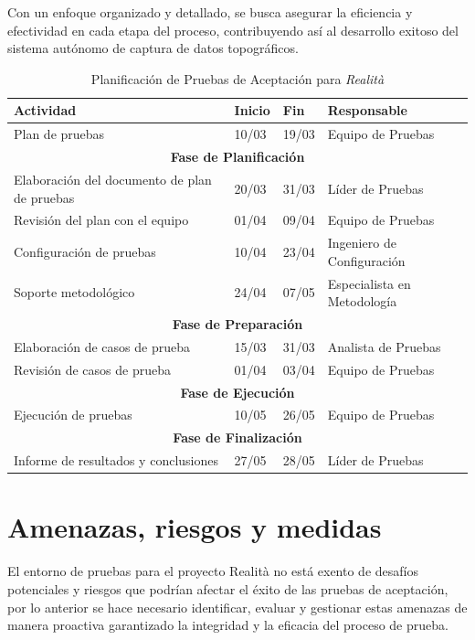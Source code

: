 \documentclass[12pt,a4paper, twoside]{article} %
\begin{document}
Con un enfoque organizado y detallado, se busca asegurar la eficiencia y efectividad en cada etapa del proceso, contribuyendo así al desarrollo exitoso del sistema autónomo de captura de datos topográficos.

\begin{table}[h]
\centering
\begin{tabular}{|l|l|l|l|}
\hline
\textbf{Actividad} & \textbf{Inicio} & \textbf{Fin} & \textbf{Responsable} \\
\hline
Plan de pruebas & 10/03 & 19/03 & Equipo de Pruebas \\
\hline
\multicolumn{4}{|c|}{\textbf{Fase de Planificación}} \\
\hline
Elaboración del documento de plan de pruebas & 20/03 & 31/03 & Líder de Pruebas \\
Revisión del plan con el equipo & 01/04 & 09/04 & Equipo de Pruebas \\
Configuración de pruebas & 10/04 & 23/04 & Ingeniero de Configuración \\
Soporte metodológico & 24/04 & 07/05 & Especialista en Metodología \\
\hline
\multicolumn{4}{|c|}{\textbf{Fase de Preparación}} \\
\hline
Elaboración de casos de prueba & 15/03 & 31/03 & Analista de Pruebas \\
Revisión de casos de prueba & 01/04 & 03/04 & Equipo de Pruebas \\
\hline
\multicolumn{4}{|c|}{\textbf{Fase de Ejecución}} \\
\hline
Ejecución de pruebas & 10/05 & 26/05 & Equipo de Pruebas \\
\hline
\multicolumn{4}{|c|}{\textbf{Fase de Finalización}} \\
\hline
Informe de resultados y conclusiones & 27/05 & 28/05 & Líder de Pruebas \\
\hline
\end{tabular}
\caption{Planificación de Pruebas de Aceptación para \textit{Realità}}
\label{tab:planning}
\end{table}

\section{Amenazas, riesgos y medidas}

El entorno de pruebas para el proyecto Realità no está exento de desafíos potenciales y riesgos que podrían afectar el éxito de las pruebas de aceptación, por lo anterior se hace necesario identificar, evaluar y gestionar estas amenazas de manera proactiva garantizado la integridad y la eficacia del proceso de prueba. 
\end{document}
